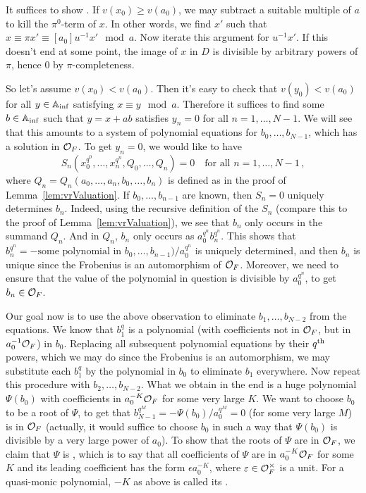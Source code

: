 \documentclass[a4paper, 10pt, oneside, DIV=9, chapterprefix=true, numbers=enddot,bibliography=totoc]{scrbook}
\begin{document}
\begin{proof*}
	It suffices to show \itememph{*}. If $v(x_0)\geq v(a_0)$, we may subtract a suitable multiple of $a$ to kill the $\pi^0$-term of $x$. In other words, we find $x'$ such that $x\equiv \pi x'\equiv [a_0]u^{-1}x'\mod a$. Now iterate this argument for $u^{-1}x'$. If this doesn't end at some point, the image of $x$ in $D$ is divisible by arbitrary powers of $\pi$, hence $0$ by $\pi$-completeness.
	
	So let's assume $v(x_0)<v(a_0)$. Then it's easy to check that $v(y_0)<v(a_0)$ for all $y\in\mathbb{A}_{\mathrm{inf}}$ satisfying $x\equiv y\mod a$. Therefore it suffices to find some $b\in \mathbb{A}_{\mathrm{inf}}$ such that $y=x+ab$ satisfies $y_n=0$ for all $n=1,\dotsc,N-1$. We will see that this amounts to a system of polynomial equations for $b_0,\dotsc,b_{N-1}$, which has a solution in $\mathcal{O}_F$. To get $y_n=0$, we would like to have
	\begin{equation*}
		S_n\left(x_0^{q^0},\dotsc,x_n^{q^n},Q_0,\dotsc,Q_n\right)=0\quad\text{for all }n=1,\dotsc,N-1\,,
	\end{equation*}
	where $Q_n=Q_n(a_0,\dotsc,a_n,b_0,\dotsc,b_n)$ is defined as in the proof of Lemma~\cref{lem:vrValuation}. If $b_0,\dotsc,b_{n-1}$ are known, then $S_n=0$ uniquely determines $b_n$. Indeed, using the recursive definition of the $S_n$ (compare this to the proof of Lemma~\cref{lem:vrValuation}), we see that $b_n$ only occurs in the summand $Q_n$. And in $Q_n$, $b_n$ only occurs as $a_0^{q^n}b_n^{q^n}$. This shows that $b_n^{q^n}=-\text{some polynomial in $b_0,\dotsc,b_{n-1}$})/a_0^{q^n}$ is uniquely determined, and then $b_n$ is unique since the Frobenius is an automorphism of $\mathcal{O}_F$. Moreover, we need to ensure that the value of the polynomial in question is divisible by $a_0^{q^n}$, to get $b_n\in\mathcal{O}_F$.
	
	Our goal now is to use the above observation to eliminate $b_1,\dotsc,b_{N-2}$ from the equations. We know that $b_1^q$ is a polynomial (with coefficients not in $\mathcal{O}_F$, but in $a_0^{-1}\mathcal{O}_F$) in $b_0$. Replacing all subsequent polynomial equations by their $q^{\text{th}}$ powers, which we may do since the Frobenius is an automorphism, we may substitute each $b_1^q$ by the polynomial in $b_0$ to eliminate $b_1$ everywhere. Now repeat this procedure with $b_2,\dotsc,b_{N-2}$. What we obtain in the end is a huge polynomial $\Psi(b_0)$ with coefficients in $a_0^{-K}\mathcal{O}_F$ for some very large $K$. We want to choose $b_0$ to be a root of $\Psi$, to get that $b_{N-1}^{q^M}=-\Psi(b_0)/a_0^{q^M}=0$ (for some very large $M$) is in $\mathcal{O}_F$ (actually, it would suffice to choose $b_0$ in such a way that $\Psi(b_0)$ is divisible by a very large power of $a_0$). To show that the roots of $\Psi$ are in $\mathcal{O}_F$, we claim that $\Psi$ is , which is to say that all coefficients of $\Psi$ are in $a_0^{-K}\mathcal{O}_F$ for some $K$ and its leading coefficient has the form $\epsilon a_0^{-K}$, where $\varepsilon\in\mathcal{O}_F^\times$ is a unit. For a quasi-monic polynomial, $-K$ as above is called its .
	

\end{proof*}
\end{document}
